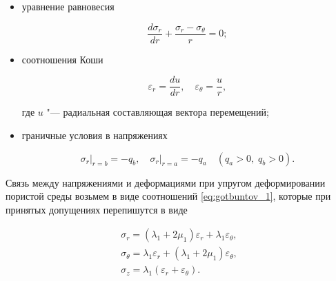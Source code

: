 \begin{itemize}

\item[--] уравнение равновесия

\begin{equation} 

\label{eq:gotbuntov_6}

\frac{d\sigma _{r} }{dr} +\frac{\sigma _{r} -\sigma _{\theta } }{r} =0;  

\end{equation}                                   



\item[--]  соотношения Коши

\begin{equation} 

\label{eq:gotbuntov_9}

\varepsilon _{r} =\frac{du}{dr} ,\quad \varepsilon _{\theta } =\frac{u}{r} , 

\end{equation}              

где $u$ "--- радиальная составляющая вектора перемещений;



\item[--]   граничные условия в напряжениях

\begin{equation} 

\label{eq:gotbuntov_9}

\sigma _{r} \bigr|_{r=b} =-q_{b} ,\quad  

\sigma _{r} \bigr|_{r=a} =-q_{a} \quad  (q_{a} >0, \; q_{b} >0). 

\end{equation}



\end{itemize}



Связь между напряжениями и деформациями при упругом деформировании пористой среды возьмем в виде соотношений \eqref{eq:gotbuntov_1}, которые при принятых допущениях перепишутся в виде

\begin{equation} \label{eq:gotbuntov_9} 

\begin{array}{l}

\sigma _{r} =\left(\lambda _{1} +2\mu _{1} \right)\varepsilon _{r} +\lambda _{1} \varepsilon _{\theta } , \\ 

\sigma _{\theta } =\lambda _{1} \varepsilon _{r} +\left(\lambda _{1} +2\mu _{1} \right)\varepsilon _{\theta } , \\

\sigma _{z} =\lambda _{1} \left(\varepsilon _{r} +\varepsilon _{\theta } \right).  

\end{array}

\end{equation}



